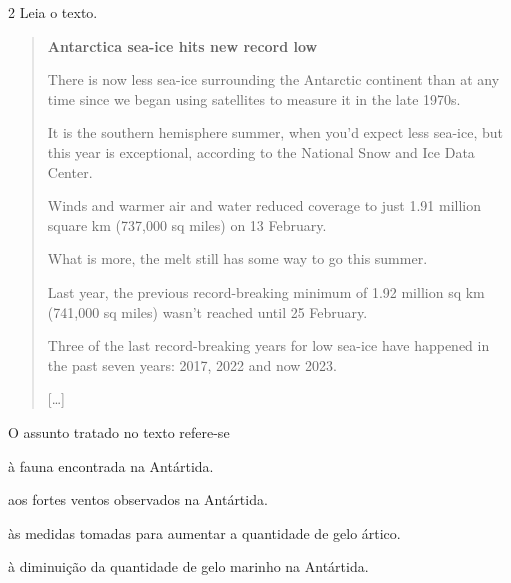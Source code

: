 
\num{2} Leia o texto.

\begin{quote}
\textbf{Antarctica sea-ice hits new record low}

There is now less sea-ice surrounding the Antarctic continent than at
any time since we began using satellites to measure it in the late
1970s.

It is the southern hemisphere summer, when you'd expect less sea-ice,
but this year is exceptional, according to the National Snow and Ice
Data Center.

Winds and warmer air and water reduced coverage to just 1.91 million
square km (737,000 sq miles) on 13 February.

What is more, the melt still has some way to go this summer.

Last year, the previous record-breaking minimum of 1.92 million sq km
(741,000 sq miles) wasn't reached until 25 February.

Three of the last record-breaking years for low sea-ice have happened in
the past seven years: 2017, 2022 and now 2023.

{[}\ldots{}{]}

\end{quote}

O assunto tratado no texto refere-se

\begin{escolha}
\item à fauna encontrada na Antártida.

\item aos fortes ventos observados na Antártida.

\item às medidas tomadas para aumentar a quantidade de gelo ártico.

\item à diminuição da quantidade de gelo marinho na Antártida.
\end{escolha}

